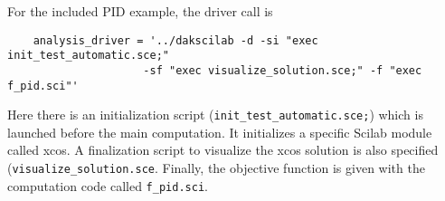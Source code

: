 For the included PID example, the driver call is 
\begin{small}
\begin{verbatim}
    analysis_driver = '../dakscilab -d -si "exec init_test_automatic.sce;"
                     -sf "exec visualize_solution.sce;" -f "exec f_pid.sci"'
\end{verbatim}
\end{small}

Here there is an initialization script
(\texttt{init\_test\_automatic.sce;}) which is launched before the
main computation.  It initializes a specific Scilab module called
xcos. A finalization script to visualize the xcos solution is also
specified (\texttt{visualize\_solution.sce}. Finally, the objective
function is given with the computation code called
\texttt{f\_pid.sci}.


